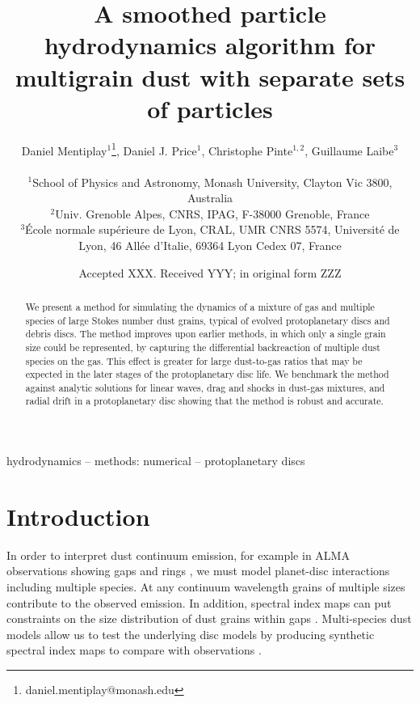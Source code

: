 \documentclass[fleqn,usenatbib]{mnras}
\title[SPH for multigrain dust]{A smoothed particle hydrodynamics algorithm for
multigrain dust with separate sets of particles}
\author[Mentiplay, Price, \& Pinte]{%
   \parbox{\textwidth}{%
      Daniel Mentiplay\(^{1}\)\thanks{daniel.mentiplay@monash.edu},
      Daniel J. Price\(^{1}\),
      Christophe Pinte\(^{1,2}\),
      Guillaume Laibe\(^{3}\)
   }\\
   \(^{1}\)School of Physics and Astronomy, Monash University, Clayton Vic 3800,
   Australia \\
   \(^{2}\)Univ. Grenoble Alpes, CNRS, IPAG, F-38000 Grenoble, France \\
   \(^{3}\)\'{E}cole normale sup\'{e}rieure de Lyon, CRAL, UMR CNRS 5574,
   Universit\'{e} de Lyon, 46 All\'{e}e d’Italie, 69364 Lyon Cedex 07, France
 \\
}
\date{Accepted XXX. Received YYY; in original form ZZZ}
\begin{document}
\label{firstpage}
\pagerange{\pageref{firstpage}--\pageref{lastpage}}
\maketitle

\begin{abstract}
   We present a method for simulating the dynamics of a mixture of gas and
   multiple species of large Stokes number dust grains, typical of evolved
   protoplanetary discs and debris discs. The method improves upon earlier
   methods, in which only a single grain size could be represented, by capturing
   the differential backreaction of multiple dust species on the gas. This
   effect is greater for large dust-to-gas ratios that may be expected in the
   later stages of the protoplanetary disc life. We benchmark the method against
   analytic solutions for linear waves, drag and shocks in dust-gas mixtures,
   and radial drift in a protoplanetary disc showing that the method is robust
   and accurate.
\end{abstract}

\begin{keywords}
hydrodynamics -- methods: numerical -- protoplanetary discs
\end{keywords}



\section{Introduction}

In order to interpret dust continuum emission, for example in ALMA observations
showing gaps and rings \citep{ALMAPartnership2015ApJ...808L...3A,
Andrews2016ApJ...820L..40A}, we must model planet-disc interactions including
multiple species. At any continuum wavelength grains of multiple sizes
contribute to the observed emission. In addition, spectral index maps can put
constraints on the size distribution of dust grains within gaps
\citep{Huang2018ApJ...852..122H}. Multi-species dust models allow us to test the
underlying disc models by producing synthetic spectral index maps to compare
with observations \citep{Casassus2015ApJ...812..126C, Pinte2016ApJ...816...25P}.
\end{document}
